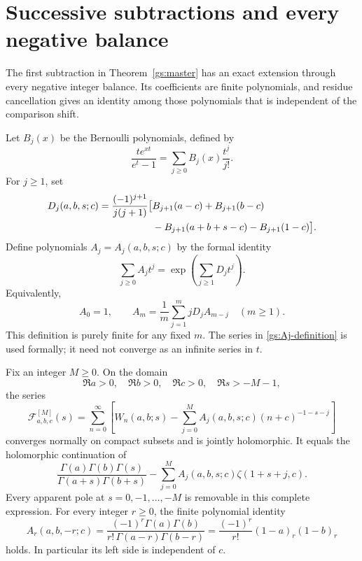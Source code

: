 
\section{Successive subtractions and every negative balance}
\label{gs:higher-balance}

The first subtraction in Theorem~\ref{gs:master} has an exact extension
through every negative integer balance.  Its coefficients are finite
polynomials, and residue cancellation gives an identity among those
polynomials that is independent of the comparison shift.

Let $B_j(x)$ be the Bernoulli polynomials, defined by
\[
 \frac{te^{xt}}{e^t-1}=\sum_{j\ge0}B_j(x)\frac{t^j}{j!}.
\]
For $j\ge1$, set
\begin{align}
 D_j(a,b,s;c)=\frac{(-1)^{j+1}}{j(j+1)}
 \bigl[&B_{j+1}(a-c)+B_{j+1}(b-c)\notag\\
       &-B_{j+1}(a+b+s-c)-B_{j+1}(1-c)\bigr].
 \label{gs:Dj}
\end{align}
Define polynomials $A_j=A_j(a,b,s;c)$ by the formal identity
\begin{equation}\label{gs:Aj-definition}
 \sum_{j\ge0}A_jt^j
 =\exp\left(\sum_{j\ge1}D_jt^j\right).
\end{equation}
Equivalently,
\begin{equation}\label{gs:Aj-recursion}
 A_0=1,\qquad
 A_m=\frac1m\sum_{j=1}^m jD_jA_{m-j}\quad(m\ge1).
\end{equation}
This definition is purely finite for any fixed $m$.  The series in
\eqref{gs:Aj-definition} is used formally; it need not converge as an
infinite series in $t$.

\begin{theorem}
\label{gs:successive-subtraction}
Fix an integer $M\ge0$.  On the domain
\[
 \Re a>0,\quad \Re b>0,\quad \Re c>0,\quad \Re s>-M-1,
\]
the series
\begin{equation}\label{gs:FM}
 \mathcal F^{[M]}_{a,b,c}(s)=
 \sum_{n=0}^{\infty}\left[
 W_n(a,b;s)-\sum_{j=0}^M
 A_j(a,b,s;c)(n+c)^{-1-s-j}\right]
\end{equation}
converges normally on compact subsets and is jointly holomorphic.  It
equals the holomorphic continuation of
\begin{equation}\label{gs:FM-closed}
 \frac{\Gamma(a)\Gamma(b)\Gamma(s)}
 {\Gamma(a+s)\Gamma(b+s)}
 -\sum_{j=0}^M A_j(a,b,s;c)\zeta(1+s+j,c).
\end{equation}
Every apparent pole at $s=0,-1,\ldots,-M$ is removable in this complete
expression.  For every integer $r\ge0$, the finite polynomial identity
\begin{equation}\label{gs:residue-rigidity}
 A_r(a,b,-r;c)
 =\frac{(-1)^r\Gamma(a)\Gamma(b)}
        {r!\,\Gamma(a-r)\Gamma(b-r)}
 =\frac{(-1)^r}{r!}(1-a)_r(1-b)_r
\end{equation}
holds.  In particular its left side is independent of $c$.
\end{theorem}

